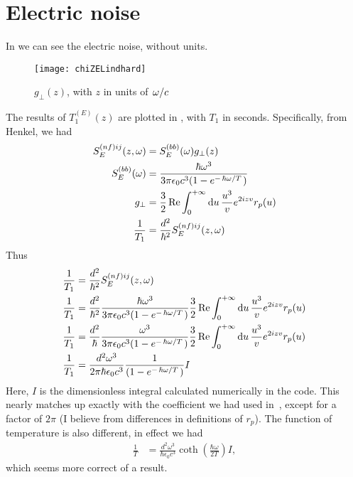 \documentclass[11pt]{article}
\begin{document}
	\section{Electric noise} \label{sec:ElectricNoise}
	In  we can see the electric noise, without units.
	\begin{figure}[htp]
		\centering
		\texttt{[image: chiZELindhard]}
		\caption{$g_{\perp}(z)$, with $z$ in units of $\flatfrac{\omega}{c}$} \label{fig:chizee}
	\end{figure}

	The results of $T_1^{(E)}(z)$ are plotted in , with $T_1$ in seconds.
	Specifically, from Henkel\supercite{Henkel1999}, we had
	\begin{align}
		S^{(nf)ij}_E(z, \omega) &= S^{(bb)}_E(\omega) g_{\perp}(z) \\
		S^{(bb)}_E(\omega) &= \frac{\hbar \omega^3}{3 \pi \epsilon_0 c^3 (1 - e^{-\flatfrac{\hbar \omega}{T}})} \\
		g_\perp &= \frac32 \Re \int_0^{+\infty} \dd{u} \frac{u^3}{v} e^{2 i z v} r_p(u) \\
		\frac{1}{T_1} &= \frac{d^2}{\hbar^2} S^{(nf)ij}_E(z, \omega)
	\end{align}
	Thus
	\begin{align}
		\frac{1}{T_1} &= \frac{d^2}{\hbar^2} S^{(nf)ij}_E(z, \omega) \\
		\frac{1}{T_1} &= \frac{d^2}{\hbar^2} \frac{\hbar \omega^3}{3 \pi \epsilon_0 c^3 (1 - e^{-\flatfrac{\hbar \omega}{T}})} \frac32 \Re \int_0^{+\infty} \dd{u} \frac{u^3}{v} e^{2 i z v} r_p(u) \\
		\frac{1}{T_1} &= \frac{d^2}{\hbar} \frac{\omega^3}{3 \pi \epsilon_0 c^3 (1 - e^{-\flatfrac{\hbar \omega}{T}})} \frac32 \Re \int_0^{+\infty} \dd{u} \frac{u^3}{v} e^{2 i z v} r_p(u) \\
		\frac{1}{T_1} &= \frac{d^2 \omega^3}{2 \pi \hbar \epsilon_0 c^3} \frac{1}{(1 - e^{-\flatfrac{\hbar \omega}{T}})} I
	\end{align}
	Here, $I$ is the dimensionless integral calculated numerically in the code.
	This nearly matches up exactly with the coefficient we had used in~\cite{QubitRelax}, except for a factor of $2\pi$ (I believe from differences in definitions of $r_p$).
	The function of temperature is also different, in effect we had
	\begin{align}
		\frac{1}{T} &= \frac{d^2 \omega^3}{\hbar \epsilon_0 c^3} \coth(\frac{\hbar \omega}{2 T}) I, \label{eq:actualTime}
	\end{align}
	which seems more correct of a result.
\end{document}

